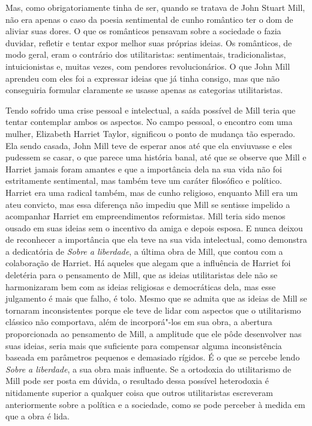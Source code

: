 Mas, como obrigatoriamente tinha de ser, quando se tratava de John
Stuart Mill, não era apenas o caso da poesia sentimental de cunho
romântico ter o dom de aliviar suas dores. O que os românticos pensavam
sobre a sociedade o fazia duvidar, refletir e tentar expor melhor suas
próprias ideias. Os românticos, de modo geral, eram o contrário dos
utilitaristas: sentimentais, tradicionalistas, intuicionistas e, muitas
vezes, com pendores revolucionários. O que John Mill aprendeu com eles
foi a expressar ideias que já tinha consigo, mas que não conseguiria
formular claramente se usasse apenas as categorias utilitaristas. 

Tendo sofrido uma crise pessoal e intelectual, a saída possível de Mill
teria que tentar contemplar ambos os aspectos. No campo pessoal, o
encontro com uma mulher, Elizabeth Harriet Taylor, significou o ponto
de mudança tão esperado. Ela sendo casada, John Mill teve de esperar
anos até que ela enviuvasse e eles pudessem se casar, o que parece
uma história banal, até que se observe que Mill e Harriet jamais
foram amantes e que a importância dela na sua vida não foi
estritamente sentimental, mas também teve um caráter filosófico e
político. Harriet era uma radical também, mas de cunho religioso,
enquanto Mill era um ateu convicto, mas essa diferença não impediu que
Mill se sentisse impelido a acompanhar Harriet em empreendimentos
reformistas. Mill teria sido menos ousado em suas ideias sem o
incentivo da amiga e depois esposa. E nunca deixou de reconhecer a
importância que ela teve na sua vida intelectual, como demonstra a
dedicatória de \textit{Sobre a liberdade}, a última obra de Mill, que
contou com a colaboração de Harriet. Há aqueles que alegam que a
influência de Harriet foi deletéria para o pensamento de Mill, que as
ideias utilitaristas dele não se harmonizaram bem com as ideias religiosas e
democráticas dela, mas esse julgamento é mais que falho, é tolo. Mesmo
que se admita que as ideias de Mill se tornaram inconsistentes porque
ele teve de lidar com aspectos que o utilitarismo clássico não
comportava, além de incorporá"-los em sua obra, a abertura
proporcionada ao pensamento de Mill, a amplitude que ele pôde
desenvolver nas suas ideias, seria mais que suficiente para compensar
alguma inconsistência baseada em parâmetros pequenos e demasiado
rígidos. É o que se percebe lendo \textit{Sobre a liberdade}, a sua
obra mais influente. Se a ortodoxia do utilitarismo de Mill pode ser
posta em dúvida, o resultado dessa possível heterodoxia é nitidamente
superior a qualquer coisa que outros utilitaristas escreveram
anteriormente sobre a política e a sociedade, como se pode perceber à
medida em que a obra é lida. 

